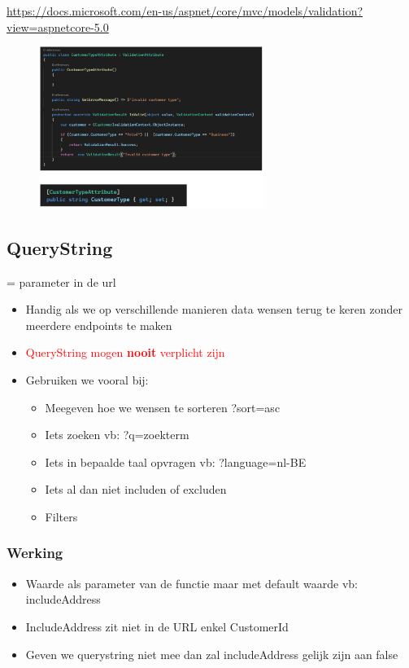 \documentclass{article}
\begin{document}
\url{https://docs.microsoft.com/en-us/aspnet/core/mvc/models/validation?view=aspnetcore-5.0}

\begin{figure}[H]
    \centering
    \includegraphics[width=0.65\textwidth]{validation-custom.png}
    \caption{}
\end{figure}

\subsection{QueryString}

= parameter in de url

\begin{itemize}
    \item Handig als we op verschillende manieren data wensen terug te keren zonder meerdere endpoints te maken
    \item \textcolor{red}{QueryString mogen \textbf{nooit} verplicht zijn}
    \item Gebruiken we vooral bij:
    \begin{itemize}
        \item Meegeven hoe we wensen te sorteren ?sort=asc
        \item Iets zoeken vb: ?q=zoekterm
        \item Iets in bepaalde taal opvragen vb: ?language=nl-BE
        \item Iets al dan niet includen of excluden
        \item Filters
    \end{itemize}
\end{itemize}

\subsubsection{Werking}

\begin{itemize}
    \item Waarde als parameter van de functie maar met default waarde vb: includeAddress
    \item IncludeAddress zit niet in de URL enkel CustomerId
    \item Geven we querystring niet mee dan zal includeAddress gelijk zijn aan false
\end{itemize}
\end{document}
